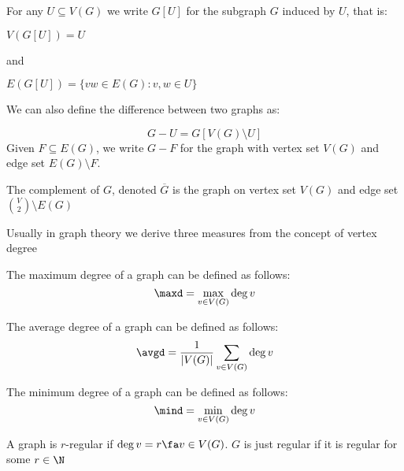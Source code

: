 For any $U \subseteq V(G)$ we write $G[U]$ for the subgraph $G$ induced by $U$, that is:

$V(G[U]) = U$

and

$E(G[U]) = \{vw \in E(G): v, w \in U\}$

We can also define the difference between two graphs as:

\begin{equation*}
    G - U = G[V(G) \setminus U]
\end{equation*}
Given $F \subseteq E(G)$, we write $G - F$ for the graph with vertex set $V(G)$ and edge set $E(G) \setminus F$.

\begin{definition}[Complement]
    The complement of $G$, denoted $\overline{G}$ is the graph on vertex set $V(G)$ and edge set $\binom{V}{2} \setminus E(G)$
\end{definition}
Usually in graph theory we derive three measures from the concept of vertex degree
\begin{definition}
    The maximum degree of a graph can be defined as follows:
    \begin{equation*}
        \maxd = \max_{v \in V(G)}\deg{v}
    \end{equation*}
\end{definition}
\begin{definition}
    The average degree of a graph can be defined as follows:
    \begin{equation*}
        \avgd = \frac{1}{|V(G)|}\sum_{v \in V(G)}\deg{v}
    \end{equation*}
\end{definition}
\begin{definition}
    The minimum degree of a graph can be defined as follows:
    \begin{equation*}
        \mind = \min_{v \in V(G)}\deg{v}
    \end{equation*}
\end{definition}
\begin{definition}
    A graph is $r$-regular if $\deg{v} = r \fa v \in V(G)$. $G$ is just regular if it is regular for some $r \in \N$
\end{definition}

